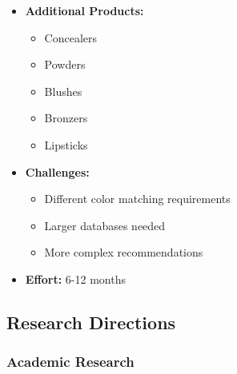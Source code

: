 \begin{itemize}
    \item \textbf{Additional Products:}
    \begin{itemize}
        \item Concealers
        \item Powders
        \item Blushes
        \item Bronzers
        \item Lipsticks
    \end{itemize}
    \item \textbf{Challenges:}
    \begin{itemize}
        \item Different color matching requirements
        \item Larger databases needed
        \item More complex recommendations
    \end{itemize}
    \item \textbf{Effort:} 6-12 months
\end{itemize}

\subsection{Research Directions}

\subsubsection{Academic Research}

